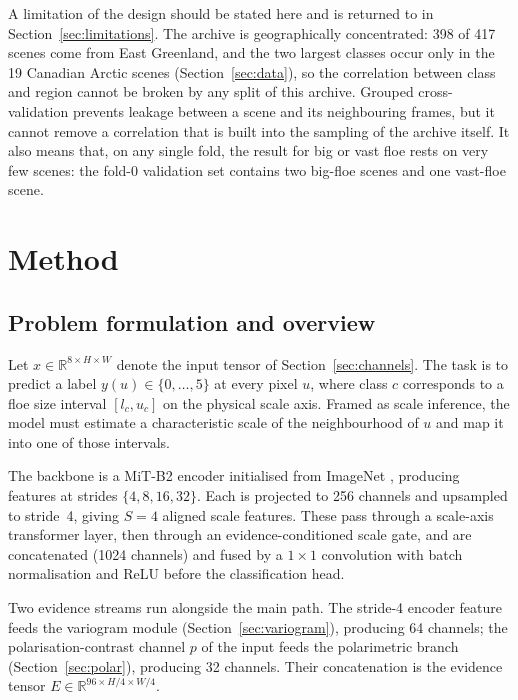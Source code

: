 \documentclass[preprint,12pt,authoryear]{elsarticle}
\begin{document}
A limitation of the design should be stated here and is returned to in
Section~\ref{sec:limitations}. The archive is geographically concentrated: 398
of 417 scenes come from East Greenland, and the two largest classes occur only
in the 19 Canadian Arctic scenes (Section~\ref{sec:data}), so the correlation
between class and region cannot be broken by any split of this archive. Grouped
cross-validation prevents leakage between a scene and its neighbouring frames,
but it cannot remove a correlation that is built into the sampling of the
archive itself. It also means that, on any single fold, the result for big or
vast floe rests on very few scenes: the fold-0 validation set contains two
big-floe scenes and one vast-floe scene.

\section{Method}
\label{sec:method}

\subsection{Problem formulation and overview}

Let $x \in \mathbb{R}^{8 \times H \times W}$ denote the input tensor of
Section~\ref{sec:channels}. The task is to predict a label
$y(u) \in \{0,\dots,5\}$ at every pixel $u$, where class $c$ corresponds to a
floe size interval $[l_c, u_c]$ on the physical scale axis. Framed as scale
inference, the model must estimate a characteristic scale of the neighbourhood
of $u$ and map it into one of those intervals.

The backbone is a MiT-B2 encoder \citep{xie2021segformer} initialised from
ImageNet \citep{deng2009imagenet}, producing features at strides
$\{4, 8, 16, 32\}$. Each is projected to 256 channels and upsampled to stride~4,
giving $S=4$ aligned scale features. These pass through a scale-axis transformer
layer, then through an evidence-conditioned scale gate, and are concatenated
(1024 channels) and fused by a $1\times1$ convolution with batch normalisation
and ReLU before the classification head.

Two evidence streams run alongside the main path. The stride-4 encoder feature
feeds the variogram module (Section~\ref{sec:variogram}), producing 64 channels;
the polarisation-contrast channel $p$ of the input feeds the polarimetric branch
(Section~\ref{sec:polar}), producing 32 channels. Their concatenation is the
evidence tensor $E \in \mathbb{R}^{96 \times H/4 \times W/4}$.
\end{document}
